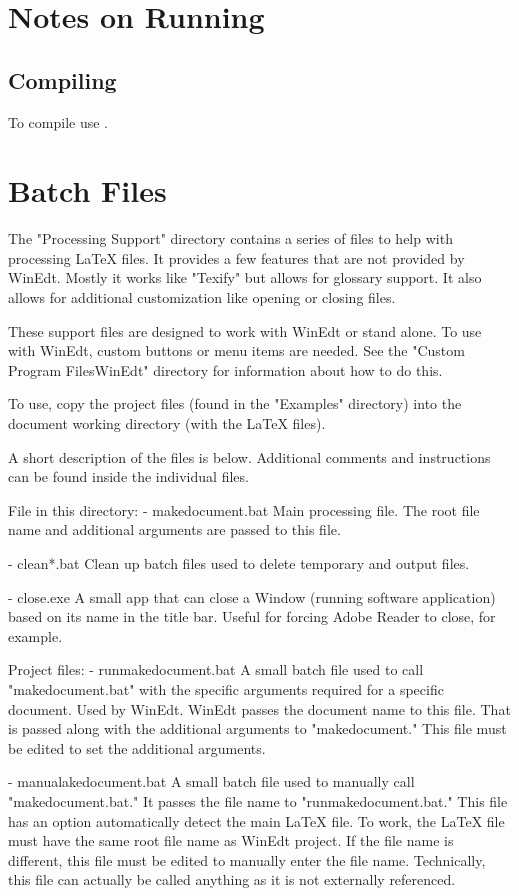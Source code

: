 \section{Notes on Running}
\subsection{Compiling}
\begin{bulletedlist}
	\item To compile use .
\end{bulletedlist}


\section{Batch Files}
The "Processing Support" directory contains a series of files to help with processing \LaTeX{} files.  It provides a few features that are not provided by WinEdt.  Mostly it works like "Texify" but allows for glossary support.  It also allows for additional customization like opening or closing files.

These support files are designed to work with WinEdt or stand alone.  To use with WinEdt, custom buttons or menu items are needed.  See the "Custom Program Files\tbs{}WinEdt" directory for information about how to do this.

To use, copy the project files (found in the "Examples" directory) into the document working directory (with the LaTeX files).

A short description of the files is below.  Additional comments and instructions can be found inside the individual files.

File in this directory:
 - makedocument.bat
	Main processing file.  The root file name and additional arguments are passed to this file.

 - clean*.bat
	Clean up batch files used to delete temporary and output files.

 - close.exe
	A small app that can close a Window (running software application) based on its name in the title bar.
	Useful for forcing Adobe Reader to close, for example.

Project files:
 - runmakedocument.bat
	A small batch file used to call "makedocument.bat" with the specific arguments required for a specific document.
	Used by WinEdt.  WinEdt passes the document name to this file.  That is passed along with the additional arguments to "makedocument."
	This file must be edited to set the additional arguments.

 - manualakedocument.bat
	A small batch file used to manually call "makedocument.bat."  It passes the file name to "runmakedocument.bat."
	This file has an option automatically detect the main \LaTeX{} file.
		To work, the \LaTeX{} file must have the same root file name as WinEdt project.
		If the file name is different, this file must be edited to manually enter the file name.
	Technically, this file can actually be called anything as it is not externally referenced. 